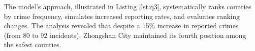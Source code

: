 The model's approach, illustrated in Listing \ref{lst:q3}, systematically ranks counties by crime frequency, simulates increased reporting rates, and evaluates ranking changes. The analysis revealed that despite a 15\% increase in reported crimes (from 80 to 92 incidents), Zhongshan City maintained its fourth position among the safest counties.





  
  
  
  
  
  
  
%














